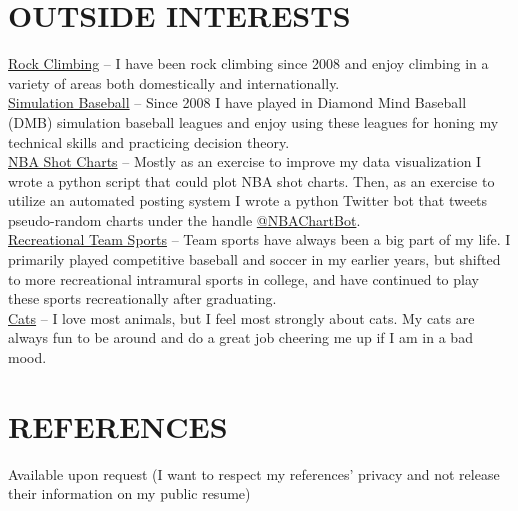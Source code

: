 \documentclass[margin]{res}
\begin{document}
\begin{resume}
\section{OUTSIDE INTERESTS}
\textbullet\hspace{3pt} \href{http://connor-r.github.io/cr_interests.html#bouldering}{Rock Climbing}  -- I have been rock climbing since 2008 and enjoy climbing in a variety of areas both domestically and internationally.
\smallskip\\\textbullet\hspace{3pt} \href{http://connor-r.github.io/Posts/sim_league_team_projections.html}{Simulation Baseball} -- Since 2008 I have played in Diamond Mind Baseball (DMB) simulation baseball leagues and enjoy using these leagues for honing my technical skills and practicing decision theory.
\smallskip\\\textbullet\hspace{3pt} \href{http://connor-r.github.io/Posts/nba_shot_charts_2018update.html}{NBA Shot Charts} -- Mostly as an exercise to improve my data visualization I wrote a python script that could plot NBA shot charts. Then, as an exercise to utilize an automated posting system I wrote a python Twitter bot that tweets pseudo-random charts under the handle \href{https://twitter.com/NBAChartBot}{@NBAChartBot}.
\smallskip\\\textbullet\hspace{3pt} \href{http://connor-r.github.io/cr_interests.html#recSports}{Recreational Team Sports} --  Team sports have always been a big part of my life. I primarily played competitive baseball and soccer in my earlier years, but shifted to more recreational intramural sports in college, and have continued to play these sports recreationally after graduating. 
\smallskip\\\textbullet\hspace{3pt} \href{http://connor-r.github.io/cr_interests.html#cats}{Cats} -- I love most animals, but I feel most strongly about cats. My cats are always fun to be around and do a great job cheering me up if I am in a bad mood.

\section{REFERENCES}
Available upon request (I want to respect my references' privacy and not release their information on my public resume)



\end{resume}
\end{document}
